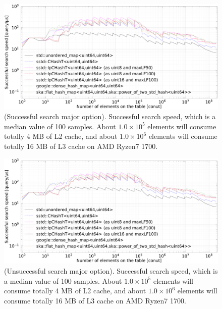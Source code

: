 \begin{figure}[h]
  \hspace{-3mm}
  \includegraphics[scale=0.24]{./fig_bench_sm/find_successful_search_med.pdf}
  \caption{
    (Successful search major option). Successful search speed, which is a median value of 100 samples.
    About $1.0\times10^5$ elements will consume totally 4 MB of L2 cache,
    and about $1.0\times10^6$ elements will consume totally 16 MB of L3 cache on AMD Ryzen7 1700.
  }
  \label{fig_bench_find_s_sm}
\end{figure}

\begin{figure}[h]
  \hspace{-3mm}
  \includegraphics[scale=0.24]{./fig_bench_usm/find_successful_search_med.pdf}
  \caption{
    (Unsuccessful search major option). Successful search speed, which is a median value of 100 samples.
    About $1.0\times10^5$ elements will consume totally 4 MB of L2 cache,
    and about $1.0\times10^6$ elements will consume totally 16 MB of L3 cache on AMD Ryzen7 1700.
  }
  \label{fig_bench_find_s_um}
\end{figure}


